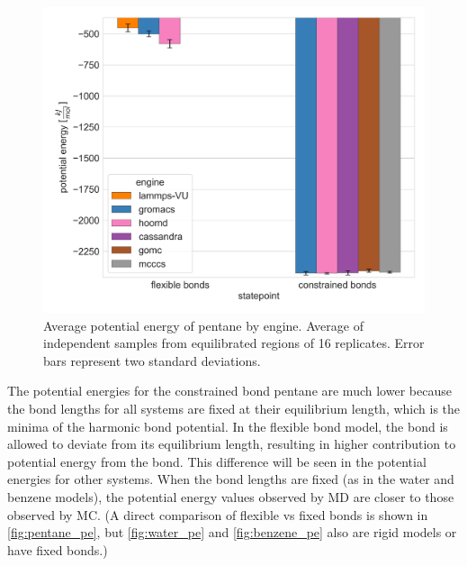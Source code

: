 \begin{figure}[h!]
    \centering
    \includegraphics[width=0.8\linewidth,keepaspectratio]{figures/rep_study/pentane_pe_summary.png}
    \caption{Average potential energy of pentane by engine. Average of independent samples from equilibrated regions of 16 replicates. Error bars represent two standard deviations.}\label{fig:pentane_pe}
\end{figure}
The potential energies for the constrained bond pentane are much lower because the bond lengths for all systems are fixed at their equilibrium length, which is the minima of the harmonic bond potential.
In the flexible bond model, the bond is allowed to deviate from its equilibrium length, resulting in higher contribution to potential energy from the bond. 
This difference will be seen in the potential energies for other systems. 
When the bond lengths are fixed (as in the water and benzene models), the potential energy values observed by MD are closer to those observed by MC. 
(A direct comparison of flexible vs fixed bonds is shown in \autoref{fig:pentane_pe}, but \autoref{fig:water_pe} and \autoref{fig:benzene_pe} also are rigid models or have fixed bonds.)

